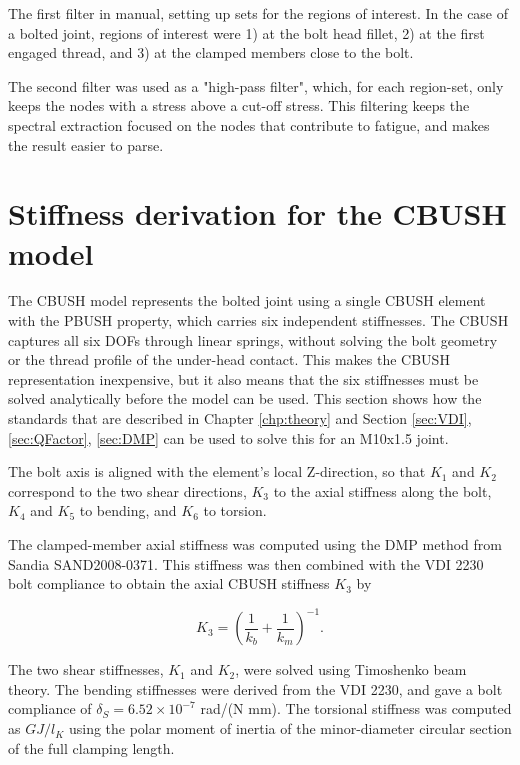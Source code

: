 \documentclass[a4paper,twoside]{bth}
\begin{document}
The first filter in manual, setting up sets for the regions of interest. In the case of a bolted joint, regions of interest were 1) at the bolt head fillet, 2) at the first engaged thread, and 3) at the clamped members close to the bolt.

The second filter was used as a "high-pass filter", which, for each region-set, only keeps the nodes with a stress above a cut-off stress. This filtering keeps the spectral extraction focused on the nodes that contribute to fatigue, and makes the result easier to parse.

\section{Stiffness derivation for the CBUSH model} \label{sec:CBUSH_Stiffness}
The CBUSH model represents the bolted joint using a single CBUSH element with the PBUSH property, which carries six independent stiffnesses. The CBUSH captures all six \ac{DOF}s through linear springs, without solving the bolt geometry or the thread profile of the under-head contact. This makes the CBUSH representation inexpensive, but it also means that the six stiffnesses must be solved analytically before the model can be used. This section shows how the standards that are described in Chapter \ref{chp:theory} and Section \ref{sec:VDI}, \ref{sec:QFactor}, \ref{sec:DMP} can be used to solve this for an M10x1.5 joint.

The bolt axis is aligned with the element's local Z-direction, so that $K_1$ and $K_2$ correspond to the two shear directions, $K_3$ to the axial stiffness along the bolt, $K_4$ and $K_5$ to bending, and $K_6$ to torsion.

The clamped-member axial stiffness was computed using the \ac{DMP} method from Sandia SAND2008-0371. This stiffness was then combined with the VDI 2230 bolt compliance to obtain the axial CBUSH stiffness $K_3$ by

\begin{equation}
    K_3 = \left(\frac{1}{k_b}+\frac{1}{k_m}\right)^{-1}.
\end{equation}

The two shear stiffnesses, $K_1$ and $K_2$, were solved using Timoshenko beam theory. The bending stiffnesses were derived from the VDI 2230, and gave a bolt compliance of $\delta_S = 6.52 \times 10^{-7}$ rad/(N mm). The torsional stiffness was computed as $GJ/l_K$ using the polar moment of inertia of the minor-diameter circular section of the full clamping length.
\end{document}
